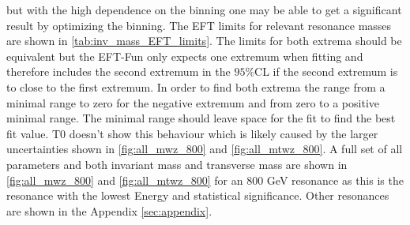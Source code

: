 \documentclass[../Bachelorarbeit.tex]{subfiles}
\begin{document}
but with the high dependence on the binning one may be able to get a significant result by optimizing the binning. The EFT limits for relevant resonance masses are shown in \ref{tab:inv_mass_EFT_limits}. The limits for both extrema should be equivalent but the EFT-Fun only expects one extremum when fitting
and therefore includes the second extremum in the $95\%$CL if the second extremum is to close to the first extremum.  In order to find both extrema the range from a minimal range to zero for the negative extremum and from zero to a positive minimal range.
The minimal range should leave space for the fit to find the best fit value. T0 doesn't show this behaviour which is likely caused by the larger uncertainties shown in \ref{fig:all_mwz_800} and \ref{fig:all_mtwz_800}.
A full set of all parameters and both invariant mass and transverse mass are shown in \ref{fig:all_mwz_800} and \ref{fig:all_mtwz_800} for an 800 GeV resonance as this is the resonance with the lowest Energy and statistical significance. Other resonances are shown in the Appendix \ref{sec:appendix}.
\end{document}
